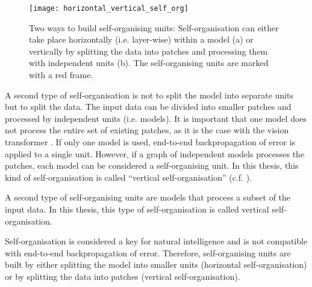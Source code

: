 \begin{figure}[h]
    \centering
    \texttt{[image: horizontal\_vertical\_self\_org]}
     \caption[Overview of horizontal and vertical self-organisation]{Two ways to build self-organising units: Self-organisation can either take place horizontally (i.e. layer-wise) within a model (a) or vertically by splitting the data into patches and processing them with independent units (b). The self-organising units are marked with a red frame.}
\end{figure}
 
A second type of self-organisation is not to split the model into separate units but to split the data.
The input data can be divided into smaller patches and processed by independent units (i.e. models).
It is important that one model does not process the entire set of existing patches, as it is the case with the vision transformer . If only one model is used, end-to-end backpropagation of error is applied to a single unit.
However, if a graph of independent models processes the patches, each model can be considered a self-organising unit.
In this thesis, this kind of self-organisation is called  ``vertical self-organisation'' (c.f.  ).

\begin{implementation}
	A second type of self-organising units are models that process a subset of the input data. In this thesis, this type of self-organisation is called vertical self-organisation.
\end{implementation}

Self-organisation is considered a key for natural intelligence and is not compatible with end-to-end backpropagation of error. Therefore, self-organising units are built by either splitting the model into smaller units (horizontal self-organisation) or by splitting the data into patches (vertical self-organisation).

